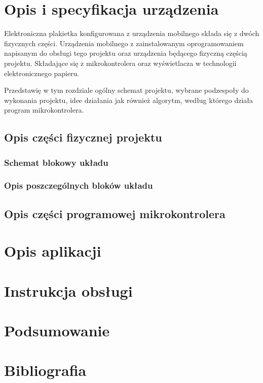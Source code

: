 \documentclass[a4paper,12pt, twoside]{article}
\begin{document}
	\section{Opis i specyfikacja urządzenia}
	Elektroniczna plakietka konfigurowana z urządzenia mobilnego składa się z dwóch fizycznych części. Urządzenia mobilnego z zainstalowanym oprogramowaniem napisanym do obsługi tego projektu oraz urządzenia będącego fizyczną częścią projektu. Składające się z mikrokontrolera oraz wyświetlacza w technologii elektronicznego papieru.

    Przedstawię w tym rozdziale ogólny schemat projektu, wybrane podzespoły do wykonania projektu, idee działania jak również algorytm, według którego działa program mikrokontrolera.
    
    \subsection{Opis części fizycznej projektu}
    
    \subsubsection{Schemat blokowy układu}
    \subsubsection{Opis poszczególnych bloków układu}
    \subsection{Opis części programowej mikrokontrolera}
	
	
	
	
	\section{Opis aplikacji}
	\section{Instrukcja obsługi}
	\section{Podsumowanie}
	
	\newpage
	\section{Bibliografia}
	
\end{document}
